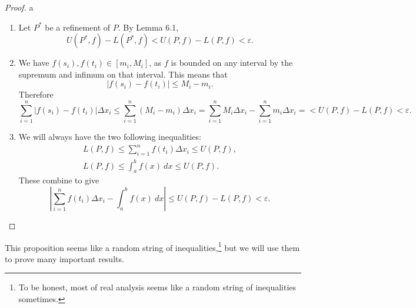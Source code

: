 \documentclass{article}
\theoremstyle{definition}
\begin{document}
	\begin{proof}{\color{white}a}
		\begin{enumerate}
			\item Let $ P^* $ be a refinement of $ P $. By Lemma 6.1, $$U(P^*,f)-L(P^*,f)<U(P,f)-L(P,f)<\varepsilon .$$ 
			\item We have $ f(s_i),f(t_i)\in[m_i,M_i] $, as $ f $ is bounded on any interval by the supremum and infimum on that interval. This means that $$|f(s_i)-f(t_i)|\le M_i-m_i .$$ Therefore $$\sum_{i=1}^n|f(s_i)-f(t_i)|\Delta x_i\le\sum_{i=1}^n(M_i-m_i)\Delta x_i=\sum_{i=1}^n M_i\Delta x_i-\sum_{i=1}^n m_i\Delta x_i=<U(P,f)-L(P,f)<\varepsilon. $$
			\item We will always have the two following inequalities:
			\begin{align*}
				L(P,f)\le\sum_{i=1}^nf(t_i) \Delta x_i\le U(P,f),\\
				L(P,f)\le\int_{a}^{b}f(x)\ dx\le U(P,f).
			\end{align*}
			These combine to give $$  \left\lvert \sum_{i=1}^nf(t_i)\Delta x_i-\int_{a}^{b}f(x)\ dx\right\rvert\le U(P,f)-L(P,f)<\varepsilon. $$
		\end{enumerate}
	\end{proof}
	This proposition seems like a random string of inequalities,\footnote{To be honest, most of real analysis seems like a random string of inequalities sometimes.} but we will use them to prove many important results.
\end{document}
